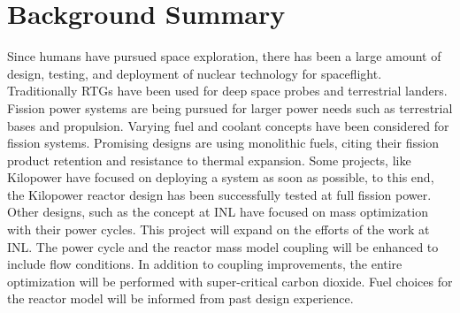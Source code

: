 \section{Background Summary}
Since humans have pursued space exploration, there has been a large amount of design, 
testing, and deployment of nuclear technology for spaceflight. Traditionally
RTGs have been used for deep space probes and terrestrial landers. Fission power
systems are being pursued for larger power needs such as terrestrial bases and
propulsion. Varying fuel and coolant concepts have been considered for fission
systems. Promising designs are using monolithic fuels, citing their fission
product retention and resistance to thermal expansion. Some projects, like
Kilopower have focused on deploying a system as soon as possible, to this end,
the Kilopower reactor design has been successfully tested at full fission power.
Other designs, such as the concept at INL have focused on mass optimization with
their power cycles. This project will expand on the efforts of the work at INL.
The power cycle and the reactor mass model coupling will be enhanced to include
flow conditions. In addition to coupling improvements, the entire optimization
will be performed with super-critical carbon dioxide. Fuel choices for the
reactor model will be informed from past design experience.

